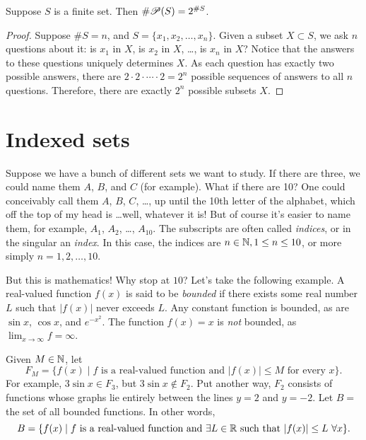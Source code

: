 \documentclass{tufte-book}
\begin{document}
\begin{proposition}
  Suppose $S$ is a finite set. Then $\# \mathscr{P}(S) = 2^{\# S}$.
\end{proposition}

\begin{proof}
  Suppose $\# S = n$, and $S = \{x_1, x_2, \dots, x_n\}$. Given a subset $X \subset S$, we ask $n$ questions about it: is $x_1$ in $X$, is $x_2$ in $X$, \dots, is $x_n$ in $X$? Notice that the answers to these questions uniquely determines $X$. As each question has exactly two possible answers, there are $2 \cdot 2 \cdot \cdots \cdot 2 = 2^n$ possible sequences of answers to all $n$ questions. Therefore, there are exactly $2^n$ possible subsets $X$.
\end{proof}



\section{Indexed sets}
\label{sec:indexed-sets}

Suppose we have a bunch of different sets we want to study. If there are three, we could name them $A$, $B$, and $C$ (for example). What if there are 10? One could conceivably call them $A$, $B$, $C$, \dots, up until the 10th letter of the alphabet, which off the top of my head is \dots well, whatever it is! But of course it's easier to name them, for example, $A_1$, $A_2$, \dots, $A_{10}$. The subscripts are often called \emph{indices}, or in the singular an \emph{index}. In this case, the indices are $n \in \mathbb{N}, 1 \leq n \leq 10$, or more simply $n = 1, 2, \dots, 10$.

But this is mathematics! Why stop at $10$? Let's take the following example. A real-valued function $f(x)$ is said to be \emph{bounded} if there exists some real number $L$ such that $|f(x)|$ never exceeds $L$. Any constant function is bounded, as are $\sin x$, $\cos x$, and $e^{-x^2}$. The function $f(x) = x$ is \emph{not} bounded, as $\lim_{x \to \infty} f = \infty$.

Given $M \in \mathbb{N}$, let 
\[
F_M = \{f(x) \mid f \text{ is a real-valued function and } |f(x)| \leq M \text{ for every } x\}.
\]
For example, $3\sin x \in F_3$, but $3\sin x \notin F_2$. Put another way, $F_2$ consists of functions whose graphs lie entirely between the lines $y = 2$ and $y = -2$. Let $B = $ the set of all bounded functions. In other words,
\[
B = \{f(x) \mid f \text{ is a real-valued function and } \exists L \in \mathbb{R} \text{ such that } |f(x)| \leq L \, \, \forall x\}.
\]
\end{document}
